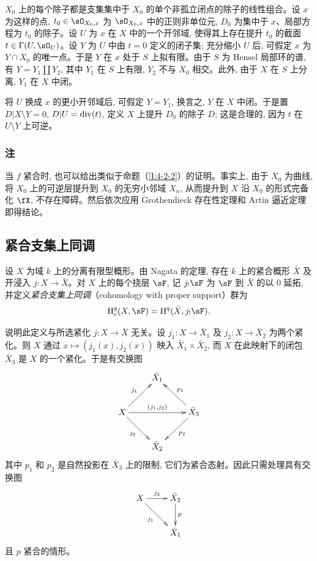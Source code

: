$X_0$ 上的每个除子都是支集集中于 $X_0$ 的单个非孤立闭点的除子的线性组合。设 $x$ 为这样的点, $t_0\in\sO_{X_0,x}$ 为 $\sO_{X_0,x}$ 中的正则非单位元, $D_0$ 为集中于 $x$、局部方程为 $t_0$ 的除子。设 $U$ 为 $x$ 在 $X$ 中的一个开邻域, 使得其上存在提升 $t_0$ 的截面 $t\in\Gamma(U,\sO_U)$。设 $Y$ 为 $U$ 中由 $t=0$ 定义的闭子集; 充分缩小 $U$ 后, 可假定 $x$ 为 $Y\cap X_0$ 的唯一点。于是 $Y$ 在 $x$ 处于 $S$ 上拟有限。由于 $S$ 为 Hensel 局部环的谱, 有 $Y=Y_1\amalg Y_2$, 其中 $Y_1$ 在 $S$ 上有限, $Y_2$ 不与 $X_0$ 相交。此外, 由于 $X$ 在 $S$ 上分离, $Y_1$ 在 $X$ 中闭。

将 $U$ 换成 $x$ 的更小开邻域后, 可假定 $Y=Y_1$, 换言之, $Y$ 在 $X$ 中闭。于是置 $D|X\setminus Y=0$, $D|U=\operatorname{div}(t)$, 定义 $X$ 上提升 $D_0$ 的除子 $D$; 这是合理的, 因为 $t$ 在 $U\setminus Y$ 上可逆。

\subsubsection{注}\label{I:4-4-2}

当 $f$ 紧合时, 也可以给出类似于命题（\ref{I:4-2-2}）的证明。事实上, 由于 $X_0$ 为曲线, 将 $X_0$ 上的可逆层提升到 $X_0$ 的无穷小邻域 $X_n$, 从而提升到 $X$ 沿 $X_0$ 的形式完备化 $\fX$, 不存在障碍。然后依次应用 Grothendieck 存在性定理和 Artin 逼近定理即得结论。

\subsection{紧合支集上同调}\label{I:4-5}

\begin{definition}\label{I:4-5-1}
设 $X$ 为域 $k$ 上的分离有限型概形。由 Nagata 的定理, 存在 $k$ 上的紧合概形 $\bar X$ 及开浸入 $j:X\to\bar X$。对 $X$ 上的每个挠层 $\sF$, 记 $j_!\sF$ 为 $\sF$ 到 $\bar X$ 的以 $0$ 延拓, 并定义\emph{紧合支集上同调}（cohomology with proper support）群为
\[
  \h_c^q(X,\sF)=\h^q(\bar X, j_! \sF) \text{.}
\]
\end{definition}

说明此定义与所选紧化 $j:X\to\bar X$ 无关。设 $j_1:X\to\bar X_1$ 及 $j_2:X\to\bar X_2$ 为两个紧化。则 $X$ 通过 $x\mapsto(j_1(x),j_2(x))$ 映入 $\bar X_1\times\bar X_2$, 而 $X$ 在此映射下的闭包 $\bar X_3$ 是 $X$ 的一个紧化。于是有交换图
\[\xymatrix{
  & \bar X_1 \\
  X \ar[ur]^-{j_1} \ar[rr]^-{(j_1,j_2)} \ar[dr]_-{j_2}
    & & \bar X_3 \ar[ul]_-{p_1} \ar[dl]^-{p_2} \\
  & \bar X_2
}\]
其中 $p_1$ 和 $p_2$ 是自然投影在 $\bar X_3$ 上的限制, 它们为紧合态射。因此只需处理具有交换图
\[\xymatrix{
  X \ar[r]^-{j_2} \ar[dr]_-{j_1}
    & \bar X_2 \ar[d]^-p \\
  & \bar X_1
}\]
且 $p$ 紧合的情形。

